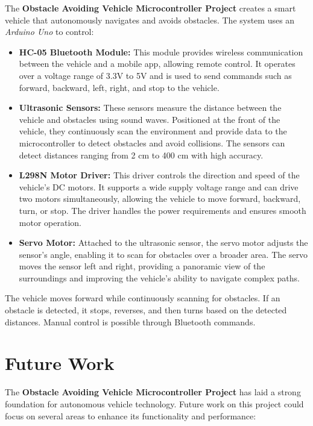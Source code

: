 \documentclass[12pt,a4paper]{report}
\begin{document}
The \textbf{Obstacle Avoiding Vehicle Microcontroller Project} creates a smart vehicle that autonomously navigates and avoids obstacles. The system uses an \textit{Arduino Uno} to control:

\begin{itemize}
    \item \textbf{HC-05 Bluetooth Module:} This module provides wireless communication between the vehicle and a mobile app, allowing remote control. It operates over a voltage range of 3.3V to 5V and is used to send commands such as forward, backward, left, right, and stop to the vehicle.
    \item \textbf{Ultrasonic Sensors:} These sensors measure the distance between the vehicle and obstacles using sound waves. Positioned at the front of the vehicle, they continuously scan the environment and provide data to the microcontroller to detect obstacles and avoid collisions. The sensors can detect distances ranging from 2 cm to 400 cm with high accuracy.
    \item \textbf{L298N Motor Driver:} This driver controls the direction and speed of the vehicle’s DC motors. It supports a wide supply voltage range and can drive two motors simultaneously, allowing the vehicle to move forward, backward, turn, or stop. The driver handles the power requirements and ensures smooth motor operation.
    \item \textbf{Servo Motor:} Attached to the ultrasonic sensor, the servo motor adjusts the sensor’s angle, enabling it to scan for obstacles over a broader area. The servo moves the sensor left and right, providing a panoramic view of the surroundings and improving the vehicle’s ability to navigate complex paths.
\end{itemize}

The vehicle moves forward while continuously scanning for obstacles. If an obstacle is detected, it stops, reverses, and then turns based on the detected distances. Manual control is possible through Bluetooth commands.

\chapter*{Future Work}

The \textbf{Obstacle Avoiding Vehicle Microcontroller Project} has laid a strong foundation for autonomous vehicle technology. Future work on this project could focus on several areas to enhance its functionality and performance:
\end{document}
